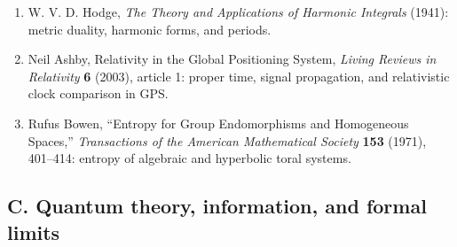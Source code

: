 \documentclass[10pt]{article}
\begin{document}
\begin{enumerate}[itemsep=1pt,topsep=3pt]
\item W. V. D. Hodge, \emph{The Theory and Applications of Harmonic Integrals} (1941): metric duality, harmonic forms, and periods.
\item Neil Ashby, Relativity in the Global Positioning System, \emph{Living Reviews in Relativity} \textbf{6} (2003), article 1: proper time, signal propagation, and relativistic clock comparison in GPS.
\item Rufus Bowen, ``Entropy for Group Endomorphisms and Homogeneous Spaces,'' \emph{Transactions of the American Mathematical Society} \textbf{153} (1971), 401--414: entropy of algebraic and hyperbolic toral systems.
\end{enumerate}
\subsection*{C. Quantum theory, information, and formal limits}
\end{document}
